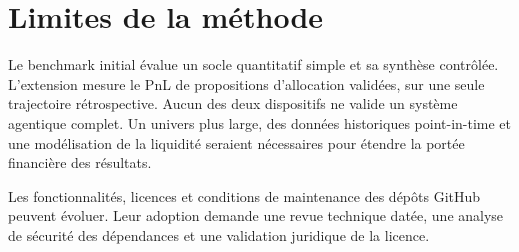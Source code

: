

\section{Limites de la méthode}

Le benchmark initial évalue un socle quantitatif simple et sa synthèse contrôlée. L'extension mesure le PnL de propositions d'allocation validées, sur une seule trajectoire rétrospective. Aucun des deux dispositifs ne valide un système agentique complet. Un univers plus large, des données historiques point-in-time et une modélisation de la liquidité seraient nécessaires pour étendre la portée financière des résultats.

Les fonctionnalités, licences et conditions de maintenance des dépôts GitHub peuvent évoluer. Leur adoption demande une revue technique datée, une analyse de sécurité des dépendances et une validation juridique de la licence.


